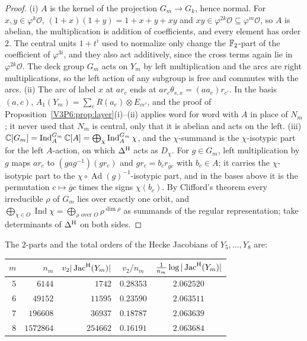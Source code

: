 \begin{proof}
(i) $A$ is the kernel of the projection $G_m\to G_k$, hence normal. For $x,y\in\varphi^{k}\mathcal O$,
$(1+x)(1+y)=1+x+y+xy$ and $xy\in\varphi^{2k}\mathcal O\subseteq\varphi^{m}\mathcal O$, so $A$ is
abelian, the multiplication is addition of coefficients, and every element has order $2$. The
central units $1+t^{i}$ used to normalize only change the $\mathbb{F}_2$-part of the coefficient of
$\varphi^{3i}$, and they also act additively, since the cross terms again lie in
$\varphi^{2k}\mathcal O$. The deck group $G_m$ acts on $Y_m$ by left multiplication and the arcs
are right multiplications, so the left action of any subgroup is free and commutes with the arcs.
(ii) The arc of label $x$ at $ar_c$ ends at $ar_c\theta_{s,x}=(aa_e)r_{c'}$. In the basis
$(a,c)$, $A_1(Y_m)=\sum_eR(a_e)\otimes E_{cc'}$, and the proof of
Proposition~\ref{V3P6:prop:layer}(i)--(ii) applies word for word with $A$ in place of $N_m$; it
never used that $N_m$ is central, only that it is abelian and acts on the left. (iii)
$\mathbb{C}[G_m]=\operatorname{Ind}_A^{G_m}\mathbb{C}[A]=\bigoplus_\chi\operatorname{Ind}_A^{G_m}\chi$, and the
$\chi$-summand is the $\chi$-isotypic part for the left $A$-action, on which $\Delta^{\mathrm{H}}$ acts as
$D_\chi$. For $g\in G_m$, left multiplication by $g$ maps $ar_c$ to $(gag^{-1})(gr_c)$ and
$gr_c=b_cr_{\bar gc}$ with $b_c\in A$; it carries the $\chi$-isotypic part to the
$\chi\circ\operatorname{Ad}(g)^{-1}$-isotypic part, and in the bases above it is the
permutation $c\mapsto\bar gc$ times the signs $\chi(b_c)$. By Clifford's theorem every
irreducible $\rho$ of $G_m$ lies over exactly one orbit, and
$\bigoplus_{\chi\in O}\operatorname{Ind}\chi=\bigoplus_{\rho\text{ over }O}\rho^{\dim\rho}$ as
summands of the regular representation; take determinants of $\Delta^{\mathrm{H}}$ on both sides.
\end{proof}

\begin{theorem}[Levels $6$, $7$, $8$]\label{V3P6:thm:v2eight}
The $2$-parts and the total orders of the Hecke Jacobians of $Y_5,\dots,Y_8$ are:
\begin{center}\small
\begin{tabular}{rrrcc}
\toprule
$m$ & $n_m$ & $v_2|\operatorname{Jac}^{\mathrm{H}}(Y_m)|$ & $v_2/n_m$ & $\frac1{n_m}\log|\operatorname{Jac}^{\mathrm{H}}(Y_m)|$\\
\midrule
$5$ & $6144$ & $1742$ & $0.28353$ & $2.062520$\\
$6$ & $49152$ & $11595$ & $0.23590$ & $2.063511$\\
$7$ & $196608$ & $36937$ & $0.18787$ & $2.063639$\\
$8$ & $1572864$ & $254662$ & $0.16191$ & $2.063684$\\
\bottomrule
\end{tabular}
\end{center}
\end{theorem}

